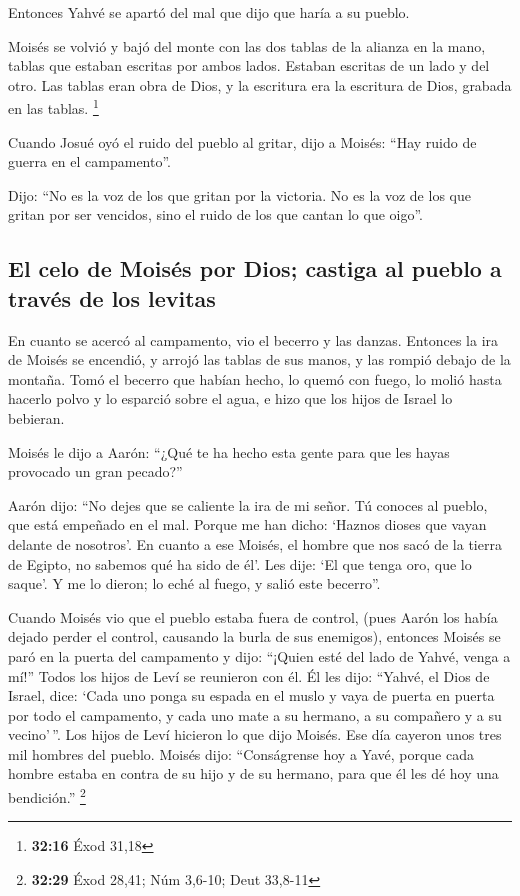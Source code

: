  Entonces Yahvé se apartó del mal que dijo que haría a su
pueblo.

 Moisés se volvió y bajó del monte con las dos tablas de
la alianza en la mano, tablas que estaban escritas por ambos lados.
Estaban escritas de un lado y del otro.  Las tablas eran
obra de Dios, y la escritura era la escritura de Dios, grabada en las
tablas. \footnote{\textbf{32:16} Éxod 31,18}

 Cuando Josué oyó el ruido del pueblo al gritar, dijo a
Moisés: ``Hay ruido de guerra en el campamento''.

 Dijo: ``No es la voz de los que gritan por la victoria.
No es la voz de los que gritan por ser vencidos, sino el ruido de los
que cantan lo que oigo''.

\hypertarget{el-celo-de-moisuxe9s-por-dios-castiga-al-pueblo-a-travuxe9s-de-los-levitas}{%
\subsection{El celo de Moisés por Dios; castiga al pueblo a través de
los
levitas}\label{el-celo-de-moisuxe9s-por-dios-castiga-al-pueblo-a-travuxe9s-de-los-levitas}}

 En cuanto se acercó al campamento, vio el becerro y las
danzas. Entonces la ira de Moisés se encendió, y arrojó las tablas de
sus manos, y las rompió debajo de la montaña.  Tomó el
becerro que habían hecho, lo quemó con fuego, lo molió hasta hacerlo
polvo y lo esparció sobre el agua, e hizo que los hijos de Israel lo
bebieran.

 Moisés le dijo a Aarón: ``¿Qué te ha hecho esta gente
para que les hayas provocado un gran pecado?''

 Aarón dijo: ``No dejes que se caliente la ira de mi
señor. Tú conoces al pueblo, que está empeñado en el mal.
 Porque me han dicho: `Haznos dioses que vayan delante de
nosotros'. En cuanto a ese Moisés, el hombre que nos sacó de la tierra
de Egipto, no sabemos qué ha sido de él'.  Les dije: `El
que tenga oro, que lo saque'. Y me lo dieron; lo eché al fuego, y salió
este becerro''.

 Cuando Moisés vio que el pueblo estaba fuera de control,
(pues Aarón los había dejado perder el control, causando la burla de sus
enemigos),  entonces Moisés se paró en la puerta del
campamento y dijo: ``¡Quien esté del lado de Yahvé, venga a mí!'' Todos
los hijos de Leví se reunieron con él.  Él les dijo:
``Yahvé, el Dios de Israel, dice: `Cada uno ponga su espada en el muslo
y vaya de puerta en puerta por todo el campamento, y cada uno mate a su
hermano, a su compañero y a su vecino'\,''.  Los hijos de
Leví hicieron lo que dijo Moisés. Ese día cayeron unos tres mil hombres
del pueblo.  Moisés dijo: ``Conságrense hoy a Yavé,
porque cada hombre estaba en contra de su hijo y de su hermano, para que
él les dé hoy una bendición.'' \footnote{\textbf{32:29} Éxod 28,41; Núm
  3,6-10; Deut 33,8-11}

